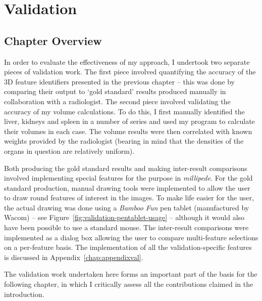 \chapter{Validation}
\label{chap:validation}

\vspace{-\baselineskip}

\section{Chapter Overview}

In order to evaluate the effectiveness of my approach, I undertook two separate pieces of validation work. The first piece involved quantifying the accuracy of the 3D feature identifiers presented in the previous chapter -- this was done by comparing their output to `gold standard' results produced manually in collaboration with a radiologist. The second piece involved validating the accuracy of my volume calculations. To do this, I first manually identified the liver, kidneys and spleen in a number of series and used my program to calculate their volumes in each case. The volume results were then correlated with known weights provided by the radiologist (bearing in mind that the densities of the organs in question are relatively uniform).

Both producing the gold standard results and making inter-result comparisons involved implementing special features for the purpose in \emph{millipede}. For the gold standard production, manual drawing tools were implemented to allow the user to draw round features of interest in the images. To make life easier for the user, the actual drawing was done using a \emph{Bamboo Fun} pen tablet (manufactured by Wacom) -- see Figure~\ref{fig:validation-pentablet-usage} -- although it would also have been possible to use a standard mouse. The inter-result comparisons were implemented as a dialog box allowing the user to compare multi-feature selections on a per-feature basis. The implementation of all the validation-specific features is discussed in Appendix~\ref{chap:appendixval}.

The validation work undertaken here forms an important part of the basis for the following chapter, in which I critically assess all the contributions claimed in the introduction.

